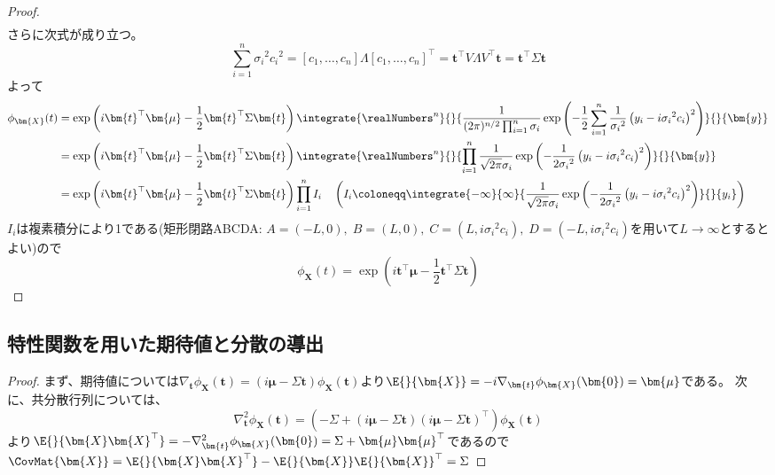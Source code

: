 \begin{proof}
\begin{align*}
                \end{align*}
                さらに次式が成り立つ。
                \[ \sum_{i=1}^n{\sigma_i}^2{c_i}^2 = [c_1,\dotsc,c_n]\Lambda[c_1,\dotsc,c_n]^\top = \bm{t}^\top V\Lambda V^\top\bm{t} = \bm{t}^\top\Sigma\bm{t} \]
                よって
                \begin{align*}
                    \phi_{\bm{X}}(t) &= \exp\left(i\bm{t}^\top\bm{\mu} - \frac{1}{2}\bm{t}^\top\Sigma\bm{t}\right)\integrate{\realNumbers^n}{}{\frac{1}{(2\pi)^{n/2}\prod_{i=1}^n\sigma_i}\exp\left(-\frac{1}{2}\sum_{i=1}^n\frac{1}{{\sigma_i}^2}\left(y_i - i{\sigma_i}^2c_i\right)^2\right)}{}{\bm{y}} \\
                    &= \exp\left(i\bm{t}^\top\bm{\mu} - \frac{1}{2}\bm{t}^\top\Sigma\bm{t}\right)\integrate{\realNumbers^n}{}{\prod_{i=1}^n\frac{1}{\sqrt{2\pi}\sigma_i}\exp\left(-\frac{1}{2{\sigma_i}^2}\left(y_i - i{\sigma_i}^2c_i\right)^2\right)}{}{\bm{y}} \\
                    &= \exp\left(i\bm{t}^\top\bm{\mu} - \frac{1}{2}\bm{t}^\top\Sigma\bm{t}\right)\prod_{i=1}^n I_i\quad \left(I_i \coloneqq \integrate{-\infty}{\infty}{\frac{1}{\sqrt{2\pi}\sigma_i}\exp\left(-\frac{1}{2{\sigma_i}^2}\left(y_i - i{\sigma_i}^2c_i\right)^2\right)}{}{y_i}\right)
                \end{align*}
                $I_i$は複素積分により1である(矩形閉路ABCDA: $A=(-L,0),\;B=(L,0),\;C=(L,i{\sigma_i}^2c_i),\;D=(-L,i{\sigma_i}^2c_i)$を用いて$L\to\infty$とするとよい)ので
                \[ \phi_{\bm{X}}(t) = \exp\left(i\bm{t}^\top\bm{\mu} - \frac{1}{2}\bm{t}^\top\Sigma\bm{t}\right) \]
            \end{proof}
        \subsection{特性関数を用いた期待値と分散の導出}
            \begin{proof}
                \quad\par
                まず、期待値については$\nabla_{\bm{t}}\phi_{\bm{X}}(\bm{t}) = (i\bm{\mu}-\Sigma\bm{t})\phi_{\bm{X}}(\bm{t})$より$\E{}{\bm{X}} = -i\nabla_{\bm{t}}\phi_{\bm{X}}(\bm{0}) = \bm{\mu}$である。
                次に、共分散行列については、
                \[ \nabla_{\bm{t}}^2\phi_{\bm{X}}(\bm{t}) = (-\Sigma + (i\bm{\mu}-\Sigma\bm{t})(i\bm{\mu}-\Sigma\bm{t})^\top)\phi_{\bm{X}}(\bm{t}) \]
                より$\E{}{\bm{X}\bm{X}^\top} = -\nabla_{\bm{t}}^2\phi_{\bm{X}}(\bm{0}) = \Sigma + \bm{\mu}\bm{\mu}^\top$であるので
                $\CovMat{\bm{X}} = \E{}{\bm{X}\bm{X}^\top} - \E{}{\bm{X}}\E{}{\bm{X}}^\top = \Sigma$
            \end{proof}
